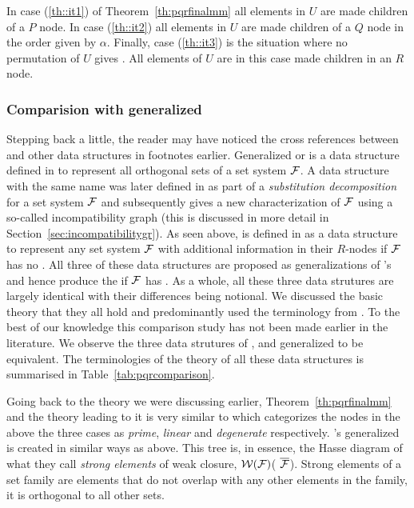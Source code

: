 In case (\ref{th::it1}) of Theorem~\ref{th:pqrfinalmm} all elements in
$U$ are made children of a $P$ node. In case (\ref{th::it2}) all
elements in $U$ are made children of a $Q$ node in the order given by
$\alpha$. Finally, case (\ref{th::it3}) is the situation where no permutation
of $U$ gives \COP. All elements of $U$ are in this case made children
in an $R$ node.

\subsubsection{Comparision with generalized \PQtree}

Stepping back a little, the reader may have noticed the cross
references between \PQRtree and other data structures in footnotes
earlier.  Generalized \PQtree or \gPQtree is a data structure defined
in \cite{n89} to represent all orthogonal sets of a set system
${\cal F}$. A data structure with the same name was later defined in
\cite{mcc04} as part of a {\em substitution decomposition} for a set
system ${\cal F}$ and subsequently \cite{mcc04} gives a new
characterization of ${\cal F}$ using a so-called incompatibility graph
(this is discussed in more detail in
Section~\ref{sec:incompatibilitygr}). As seen above, \PQRtree is
defined in \cite{mm96} as a data structure to represent any set system
${\cal F}$ with additional information in their $R$-nodes if ${\cal F}$ has no
\COP. All three of these data structures are proposed as
generalizations of \cite{bl76}'s \PQtree and hence produce the \PQtree
if ${\cal F}$ has \COP. As a whole, all these three data strutures are
largely identical with their differences being notional. We discussed
the basic theory that they all hold and predominantly used the
terminology from \cite{mm96}. To the best of our knowledge this
comparison study has not been made earlier in the literature.  We
observe the three data strutures of \PQRtree, \gPQtree and generalized
\PQtree to be equivalent. The terminologies of the theory of all these
data structures is summarised in Table~\ref{tab:pqrcomparison}.

Going back to the theory we were discussing earlier,
Theorem~\ref{th:pqrfinalmm} and the theory leading to it is very
similar to \cite[esp. Th.~2.1, 3.5. also Th.~3.2, 3.3, 3.4]{mcc04}
which categorizes the nodes in the above the three cases as {\em
  prime}, {\em linear} and {\em degenerate}
respectively. \cite{mcc04}'s generalized \PQtree is created in similar
ways as \PQRtree above. This tree is, in essence, the Hasse diagram of
what they call {\em strong elements} of weak closure, ${\cal W}({\cal F})$(\ie
$\overline{{\cal F}}$). Strong elements of a set family are elements that
do not overlap with any other elements in the family, \ie it is
orthogonal to all other sets\cite[Def.~3.3]{mcc04}.

